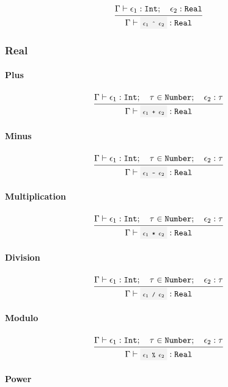 \[
	\infrule{
		\EnvSym\then \expr_1:\Int \semiq \expr_2:\Real
	}{
		\EnvSym\then \code{$\expr_1$ \^{} $\expr_2$} : \Real
	}
\]

\subsubsection{Real}

\paragraph{Plus}

\[
	\infrule{
		\EnvSym\then \expr_1:\Int \semiq \tau \in \Number \semiq \expr_2:\tau
	}{
		\EnvSym\then \code{$\expr_1$ + $\expr_2$} : \Real
	}
\]

\paragraph{Minus}

\[
	\infrule{
		\EnvSym\then \expr_1:\Int \semiq \tau \in \Number \semiq \expr_2:\tau
	}{
		\EnvSym\then \code{$\expr_1$ - $\expr_2$} : \Real
	}
\]

\paragraph{Multiplication}

\[
	\infrule{
		\EnvSym\then \expr_1:\Int \semiq \tau \in \Number \semiq \expr_2:\tau
	}{
		\EnvSym\then \code{$\expr_1$ * $\expr_2$} : \Real
	}
\]

\paragraph{Division}

\[
	\infrule{
		\EnvSym\then \expr_1:\Int \semiq \tau \in \Number \semiq \expr_2:\tau
	}{
		\EnvSym\then \code{$\expr_1$ / $\expr_2$} : \Real
	}
\]

\paragraph{Modulo}

\[
	\infrule{
		\EnvSym\then \expr_1:\Int \semiq \tau \in \Number \semiq \expr_2:\tau
	}{
		\EnvSym\then \code{$\expr_1$ \% $\expr_2$} : \Real
	}
\]

\paragraph{Power}

